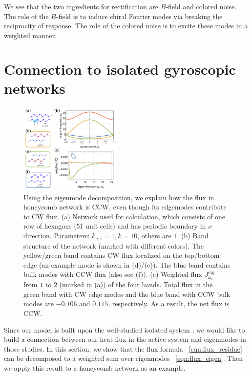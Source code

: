 \documentclass[
 preprint,
 preprintnumbers,
 amsmath,amssymb,
 aps,
 pre,
 longbibliography,
 10pt, twocolumn
]{revtex4-1}
\begin{document}
We see that the two ingredients for rectification are $B$-field and colored noise. 
The role of the $B$-field is to induce chiral Fourier modes via breaking the reciprocity of response. 
The role of the colored noise is to excite these modes in a weighted manner.


\section{Connection to isolated gyroscopic networks} \label{sec:eigenmode}

\begin{figure}[ht]
	\centering
	\includegraphics[width=0.45\textwidth]{3_eigen_modes.pdf}
    \caption{Using the eigenmode decomposition, we explain how the flux in honeycomb network is CCW, even though its edgemodes contribute to CW flux.
    (a) Network used for calculation, which consists of one row of hexagons (51 unit cells) and has periodic boundary in $x$ direction. Parameters: $k_{g,\tau}=1, k=10$, others are $1$.
    (b) Band structure of the network (marked with different colors). The yellow/green band contains CW flux localized on the top/bottom edge (an example mode is shown in (d)/(e)). The blue band contains bulk modes with CCW flux (also see (f)).
    (c) Weighted flux $J_{\omega_e}^{eig}$ from $1$ to $2$ (marked in (a)) of the four bands. Total flux in the green band with CW edge modes and the blue band with CCW bulk modes are $-0.106$ and $0.115$, respectively. As a result, the net flux is CCW.
    }
    \label{fig:eigen_modes}
\end{figure}

Since our model is built upon the well-studied isolated system \cite{Nash2015TopologicalMetamaterials,Susstrunk2016ClassificationMetamaterials,Mitchell2018AmorphousSets,Lee2018TopologicalLaws}, we would like to build a connection between our heat flux in the active system and eigenmodes in those studies. 
In this section, we show that the flux formula \eqnname~\eqref{eqn:flux_residue} can be decomposed to a weighted sum over eigenmodes \eqnname~\eqref{eqn:flux_eigen}. Then we apply this result to a honeycomb network as an example.
\end{document}

